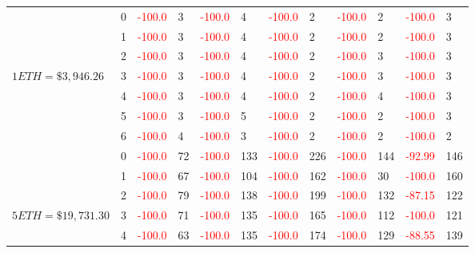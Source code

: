 \begin{table}[htb!]
\begin{adjustwidth}{-0.9in}{-0.9in}
\begin{tabular}{|p{5em}|p{2em}|p{3em}|p{3em}|p{3em}|p{3em}|p{3em}|p{3em}|p{3em}|p{3em}|p{3em}|p{3em}|}
            & 0 & \textcolor{red}{-100.0} & 3 & \textcolor{red}{-100.0} & 4 & \textcolor{red}{-100.0} & 2 & \textcolor{red}{-100.0} & 2 & \textcolor{red}{-100.0} & 3\\\cline{3-12}
            & 1 & \textcolor{red}{-100.0} & 3 & \textcolor{red}{-100.0} & 4 & \textcolor{red}{-100.0} & 2 & \textcolor{red}{-100.0} & 2 & \textcolor{red}{-100.0} & 3\\\cline{3-12}
            & 2 & \textcolor{red}{-100.0} & 3 & \textcolor{red}{-100.0} & 4 & \textcolor{red}{-100.0} & 2 & \textcolor{red}{-100.0} & 3 & \textcolor{red}{-100.0} & 3\\\cline{3-12}
            $1 ETH = \$3,946.26$ & 3 & \textcolor{red}{-100.0} & 3 & \textcolor{red}{-100.0} & 4 & \textcolor{red}{-100.0} & 2 & \textcolor{red}{-100.0} & 3 & \textcolor{red}{-100.0} & 3\\[-3ex]\cline{3-12}
            & 4 & \textcolor{red}{-100.0} & 3 & \textcolor{red}{-100.0} & 4 & \textcolor{red}{-100.0} & 2 & \textcolor{red}{-100.0} & 4 & \textcolor{red}{-100.0} & 3\\\cline{3-12}
            & 5 & \textcolor{red}{-100.0} & 3 & \textcolor{red}{-100.0} & 5 & \textcolor{red}{-100.0} & 2 & \textcolor{red}{-100.0} & 2 & \textcolor{red}{-100.0} & 3\\\cline{3-12}
            & 6 & \textcolor{red}{-100.0} & 4 & \textcolor{red}{-100.0} & 3 & \textcolor{red}{-100.0} & 2 & \textcolor{red}{-100.0} & 2 & \textcolor{red}{-100.0} & 2\\\hline\hline
            & 0 & \textcolor{red}{-100.0} & 72 & \textcolor{red}{-100.0} & 133 & \textcolor{red}{-100.0} & 226 & \textcolor{red}{-100.0} & 144 & \textcolor{red}{-92.99} & 146\\\cline{3-12}
            & 1 & \textcolor{red}{-100.0} & 67 & \textcolor{red}{-100.0} & 104 & \textcolor{red}{-100.0} & 162 & \textcolor{red}{-100.0} & 30 & \textcolor{red}{-100.0} & 160\\\cline{3-12}
            & 2 & \textcolor{red}{-100.0} & 79 & \textcolor{red}{-100.0} & 138 & \textcolor{red}{-100.0} & 199 & \textcolor{red}{-100.0} & 132 & \textcolor{red}{-87.15} & 122\\\cline{3-12}
            $5 ETH = \$19,731.30$ & 3 & \textcolor{red}{-100.0} & 71 & \textcolor{red}{-100.0} & 135 & \textcolor{red}{-100.0} & 165 & \textcolor{red}{-100.0} & 112 & \textcolor{red}{-100.0} & 121\\[-3ex]\cline{3-12}
            & 4 & \textcolor{red}{-100.0} & 63 & \textcolor{red}{-100.0} & 135 & \textcolor{red}{-100.0} & 174 & \textcolor{red}{-100.0} & 129 & \textcolor{red}{-88.55} & 139\\\cline{3-12}

\end{tabular}
\end{adjustwidth}
\end{table}
